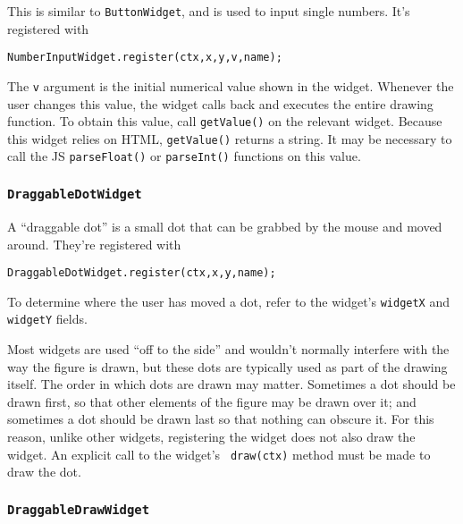 \documentclass[10pt]{article}
\begin{document}
This is similar to {\tt ButtonWidget}, and is used to input single
numbers. It's registered with 
\begin{verbatim}
NumberInputWidget.register(ctx,x,y,v,name);
\end{verbatim}
The {\tt v} argument is the initial numerical value shown in the
widget. Whenever the user changes this value, the widget calls back
and executes the entire drawing function. To obtain this value, call
{\tt getValue()} on the relevant widget. Because this widget relies
on HTML, {\tt getValue()} returns a string. It may be necessary to
call the JS {\tt parseFloat()} or {\tt parseInt()} functions on this
value. 

\subsubsection{\tt DraggableDotWidget}

A ``draggable dot'' is a small dot that can be grabbed by the mouse
and moved around. They're registered with
\begin{verbatim}
DraggableDotWidget.register(ctx,x,y,name);
\end{verbatim}
To determine where the user has moved a dot, refer to the widget's
{\tt widgetX} and {\tt widgetY} fields. 

Most widgets are used ``off to the side'' and wouldn't normally
interfere with the way the figure is drawn, but these dots are typically
used as part of the drawing itself. The order in which dots are drawn
may matter. Sometimes a dot should be drawn first, so that other
elements of the figure may be drawn over it; and sometimes a dot
should be drawn last so that nothing can obscure it. For this
reason, unlike other widgets, registering the widget does not also
draw the widget. An explicit call to the widget's {\tt
  draw(ctx)} method must be made to draw the dot.

\subsubsection{\tt DraggableDrawWidget}
\end{document}
